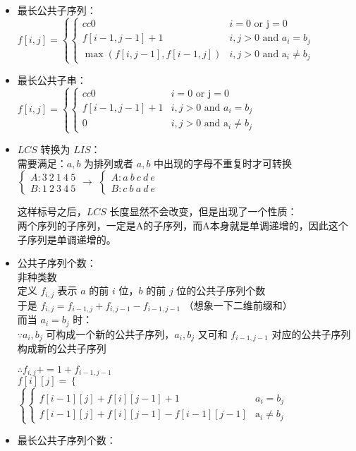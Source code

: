 \documentclass[E:/GsjzTle/main/main.tex]{subfiles}
\begin{document}
	
	\begin{itemize}
		\item
		最长公共子序列：\\
		\(f[i, j]=\left\{\begin{cases}{cc}0 & i=0 \text { or } \mathrm{j}=0 \\ f[i-1, j-1]+1 & i, j>0 \text { and } a_{i}=b_{j} \\ \max (f[i, j-1], f[i-1, j]) & i, j>0 \text { and } \mathrm{a}_{i} \neq b_{j}\end{cases}\right.\)
		\item
		最长公共子串：\\
		\(f[i, j]=\left\{\begin{cases}{cc}0 & i=0 \text { or } \mathrm{j}=0 \\ f[i-1, j-1]+1 & i, j>0 \text { and } a_{i}=b_{j} \\ 0 & i, j>0 \text { and } \mathrm{a}_{i} \neq b_{j}\end{cases}\right.\)
		\item
		\(LCS\) 转换为 \(LIS\)：\\
		需要满足：\(a,b\) 为排列或者 \(a,b\) 中出现的字母不重复时才可转换\\
		\(\begin{cases} A:3~2~1~4~5\\ B:1~2~3~4~5\end{cases} \rightarrow\)
		\(\begin{cases} A:a~b~c~d~e\\ B:c~b~a~d~e\end{cases}\)
		
		这样标号之后，\(LCS\) 长度显然不会改变，但是出现了一个性质：\\
		两个序列的子序列，一定是A的子序列，而A本身就是单调递增的，因此这个子序列是单调递增的。
		\item
		公共子序列个数：\\
		非种类数\\
		定义 \(f_{i,j}\) 表示 \(a\) 的前 \(i\) 位，\(b\) 的前 \(j\)
		位的公共子序列个数\\
		于是 \(f_{i,j} = f_{i-1,j} + f_{i,j-1}-f_{i-1,j-1}\)
		（想象一下二维前缀和）\\
		而当 \(a_i = b_j\) 时：\\
		\(\because a_i,b_j\) 可构成一个新的公共子序列，\(a_i,b_j\) 又可和
		\(f_{i-1,j-1}\) 对应的公共子序列构成新的公共子序列
		
		\(\therefore f_{i,j} += 1 + f_{i-1,j-1}\)\\
		\(f[i][j] = \begin{cases} \\ \end{cases}\)\(\left\{\begin{cases}\\ f[i - 1][j]+f[i][j-1]+1 & a_i = b_j\\ f[i - 1][j]+f[i][j - 1]-f[i-1][j-1] & \mathrm{a}_{i} \neq b_{j}\end{cases}\right.\)
		\item
		最长公共子序列个数：
		

\end{itemize}
\end{document}
